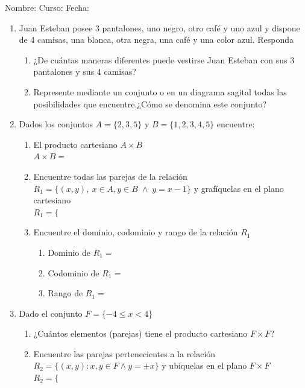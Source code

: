 \documentclass[letterpaper,fleqn]{article}
\newcommand{\LineaNombre}{%
\par
\vspace{\baselineskip}
Nombre:\hrulefill \; Curso: \underline{\hspace*{48pt}} \; Fecha: \underline{\hspace*{2.5cm}} \relax
\par}
\begin{document}
\LineaNombre
\begin{enumerate}
 \item Juan Esteban posee 3 pantalones, uno negro, otro café y uno azul y dispone de 4 camisas, una blanca, otra negra, una café y una color azul. Responda
 \begin{enumerate}
 \item ¿De cuántas maneras diferentes puede vestirse Juan Esteban con sus 3 pantalones y sus 4 camisas? \underline{\hspace{1in}}
 \item Represente mediante un conjunto o en un diagrama sagital todas las posibilidades que encuentre.¿Cómo se denomina este conjunto? \noanswer
\end{enumerate}
\item Dados los conjuntos $A=\{2,3,5\}$ y $B=\{1,2,3,4,5\}$ encuentre:
\begin{enumerate}
\item El producto cartesiano $A\times B$\\
$A \times B=$ \noanswer[.5in]
\item Encuentre todas las parejas de la relación $R_{1}=\{(x,y), \: x \in A, y \in B \; \wedge \; y=x-1\}$ y grafíquelas en el plano cartesiano\\

$R_{1}=\{$ \noanswer[.5in]
\newpage
\begin{center}

\end{center}
\item Encuentre el dominio, codominio y rango de la relación $R_{1}$
\begin{enumerate}
\item Dominio de $R_{1}=$
\item Codominio de $R_{1}=$
\item Rango de $R_{1}=$
\end{enumerate}
\end{enumerate}
\item Dado el conjunto $F=\{-4\leq x<4\}$
\begin{enumerate}
\item ¿Cuántos elementos (parejas) tiene el producto cartesiano $F\times F$? \underline{\hspace*{1in}}
\item Encuentre las parejas pertenecientes a la relación $R_{2}=\{(x,y): x,y \in F \wedge y=\pm x\}$ y ubíquelas en el plano $F\times F$\\
$R_{2}=\{$
\begin{center}

\end{center}
\end{enumerate}
 \end{enumerate}
\end{document}
